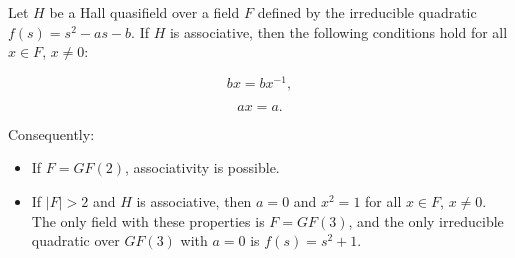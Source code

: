 Let $H$ be a Hall quasifield over a field $F$ defined by the irreducible quadratic $f(s) = s^2 - as - b$. If $H$ is associative, then the following conditions hold for all $x \in F$, $x \neq 0$:

$$bx = bx^{-1},$$

$$ax = a.$$

Consequently:
\begin{itemize}
\item If $F = GF(2)$, associativity is possible.
\item If $|F| > 2$ and $H$ is associative, then $a = 0$ and $x^2 = 1$ for all $x \in F$, $x \neq 0$. The only field with these properties is $F = GF(3)$, and the only irreducible quadratic over $GF(3)$ with $a = 0$ is $f(s) = s^2 + 1$.
\end{itemize}
